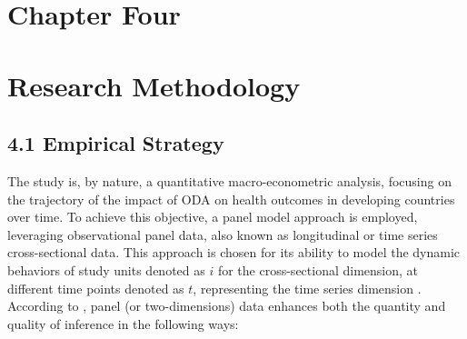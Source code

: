 \section*{\centering Chapter Four}
\section*{\centering Research Methodology}


\subsection*{4.1 Empirical Strategy}
The study is, by nature, a quantitative macro-econometric analysis, focusing on the trajectory of the impact of ODA on health outcomes in developing countries over time. To achieve this objective, a panel model approach is employed, leveraging observational panel data, also known as longitudinal or time series cross-sectional data. This approach is chosen for its ability to model the dynamic behaviors of study units denoted as $i$ for the cross-sectional dimension, at different time points denoted as $t$, representing the time series dimension \parencite{hsiao2007panel, cameron2005microeconometrics, blackwell2018make, allison2017maximum}. According to \textcite{gujarati2004econometrie}, panel (or two-dimensions) data enhances both the quantity and quality of inference in the following ways:

